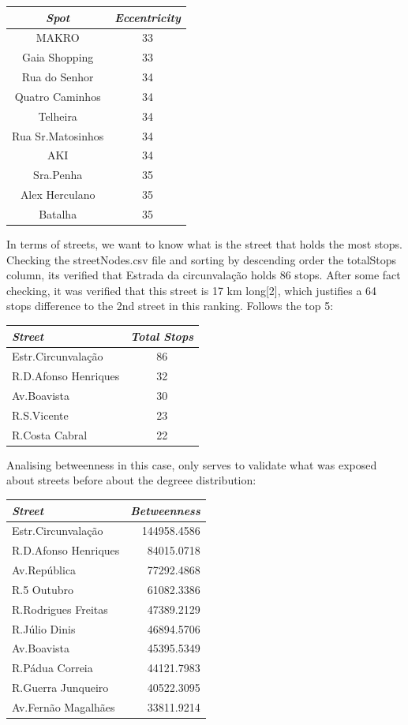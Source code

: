 \documentclass[12pt]{article}
\begin{document}
\begin{multicols}{2}
\begin{center}
\begin{tabular}[h]{|c|c|}
\hline
\em{Spot} & \em{Eccentricity}\\
\hline
MAKRO &	33\\
Gaia Shopping & 33\\
Rua do Senhor & 34\\
Quatro Caminhos	& 34\\
Telheira & 34\\
Rua Sr.Matosinhos & 34\\
AKI & 34\\
Sra.Penha & 35\\
Alex Herculano & 35\\
Batalha & 35\\
\hline
\end{tabular}
\end{center}


In terms of streets, we want to know what is the street that holds the most stops. Checking the streetNodes.csv file and sorting by descending order the totalStops column, its verified that Estrada da circunvalação holds 86 stops. After some fact checking, it was verified that this street is 17 km long[2], which justifies a 64 stops difference to the 2nd street in this ranking. Follows the top 5:
\begin{center}
\begin{tabular}[h]{|l|c|}
\hline
\em{Street} & \em{Total Stops}\\
\hline
Estr.Circunvalação & 86\\
R.D.Afonso Henriques & 32\\
Av.Boavista	& 30\\
R.S.Vicente& 23\\
R.Costa Cabral & 22\\
\hline
\end{tabular}
\end{center} 

Analising betweenness in this case, only serves to validate what was exposed about streets before about the degreee distribution:\\
\begin{center}
\begin{tabular}[h]{|l|r|}
\hline
\em{Street} & \em{Betweenness}\\
\hline
Estr.Circunvalação	& 144958.4586 \\
R.D.Afonso Henriques &	84015.0718\\
Av.República &	77292.4868\\
R.5 Outubro	& 61082.3386\\
R.Rodrigues Freitas &	47389.2129\\
R.Júlio Dinis	& 46894.5706\\
Av.Boavista &	45395.5349\\
R.Pádua Correia &	44121.7983\\
R.Guerra Junqueiro &	40522.3095\\
Av.Fernão Magalhães &	33811.9214\\


\end{tabular}
\end{center}
\end{multicols}
\end{document}
